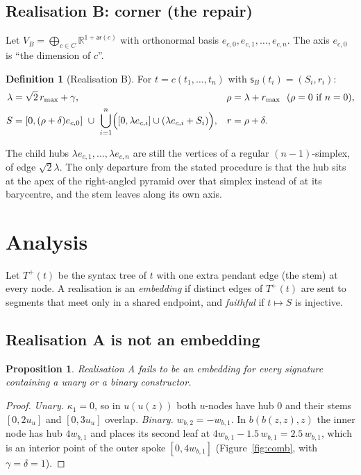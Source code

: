 \documentclass[11pt]{article}
\newtheorem{proposition}[theorem]{Proposition}
\theoremstyle{definition}
\newtheorem{definition}[theorem]{Definition}
\theoremstyle{remark}
\newcommand{\R}{\mathbb{R}}
\newcommand{\ar}{\mathsf{ar}}
\newcommand{\sh}{\mathsf{s}}
\newcommand{\rad}{r}
\begin{document}
\subsection{Realisation B: corner (the repair)}

Let $V_B=\bigoplus_{c\in C}\R^{1+\ar(c)}$ with orthonormal basis
$e_{c,0},e_{c,1},\dots,e_{c,n}$. The axis $e_{c,0}$ is ``the dimension of $c$''.

\begin{definition}[Realisation B]\label{def:B}
For $t=c(t_1,\dots,t_n)$ with $\sh_B(t_i)=(S_i,\rad_i)$:
\begin{align*}
\lambda &= \sqrt2\,\rad_{\max}+\gamma, &
\rho &= \lambda+\rad_{\max}\ \ (\rho=0 \text{ if } n=0),\\
S &= [0,(\rho+\delta)e_{c,0}]\ \cup\ \bigcup_{i=1}^n\Bigl([0,\lambda e_{c,i}]\cup(\lambda e_{c,i}+S_i)\Bigr), &
\rad &= \rho+\delta .
\end{align*}
\end{definition}

The child hubs $\lambda e_{c,1},\dots,\lambda e_{c,n}$ are still the vertices of a
regular $(n-1)$-simplex, of edge $\sqrt2\lambda$. The only departure from the
stated procedure is that the hub sits at the apex of the right-angled pyramid over
that simplex instead of at its barycentre, and the stem leaves along its own axis.

\section{Analysis}\label{sec:analysis}

Let $T^+(t)$ be the syntax tree of $t$ with one extra pendant edge (the stem)
at every node. A realisation is an \emph{embedding} if distinct edges of $T^+(t)$
are sent to segments that meet only in a shared endpoint, and \emph{faithful} if
$t\mapsto S$ is injective.

\subsection{Realisation A is not an embedding}

\begin{proposition}\label{prop:Afail}
Realisation A fails to be an embedding for every signature containing a unary or
a binary constructor.
\end{proposition}
\begin{proof}
\emph{Unary.} $\kappa_1=0$, so in $u(u(z))$ both $u$-nodes have hub $0$ and their
stems $[0,2u_u]$ and $[0,3u_u]$ overlap.
\emph{Binary.} $w_{b,2}=-w_{b,1}$. In $b(b(z,z),z)$ the inner node has hub
$4w_{b,1}$ and places its second leaf at $4w_{b,1}-1.5\,w_{b,1}=2.5\,w_{b,1}$,
which is an interior point of the outer spoke $[0,4w_{b,1}]$
(Figure~\ref{fig:comb}, with $\gamma=\delta=1$).
\end{proof}
\end{document}

